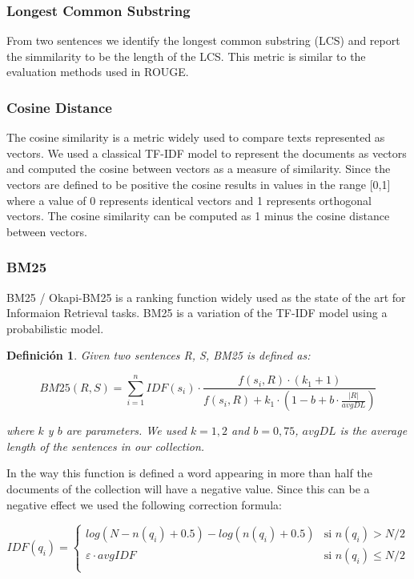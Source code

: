 \documentclass{llncs}
\newtheorem{definicion}{Definición}
\begin{document}
\subsubsection{Longest Common Substring}
From two sentences we identify the longest common substring (LCS) and report the simmilarity to be the length of the LCS. This metric is similar to the evaluation methods used in ROUGE.

\subsubsection{Cosine Distance}
The cosine similarity is a metric widely used to compare texts represented as vectors. We used a classical TF-IDF model to represent the documents as vectors and computed the cosine between vectors as a measure of similarity. Since the vectors are defined to be positive the cosine results in values in the range [0,1] where a value of 0 represents identical vectors and 1 represents orthogonal vectors. The cosine similarity can be computed as 1 minus the cosine distance between vectors. 

\subsubsection{BM25}
BM25 / Okapi-BM25 is a ranking function widely used as the state of the art for Informaion Retrieval tasks. BM25 is a variation of the TF-IDF model using a probabilistic model.

\begin{definicion}
Given two sentences R, S, BM25 is defined as:

\begin{equation}
BM25(R,S) = \sum_{i=1}^{n} IDF(s_i) \cdot \frac{f(s_i, R) \cdot (k_1 + 1)}{f(s_i, R) + k_1 \cdot (1 - b + b \cdot \frac{|R|}{avgDL})}
\end{equation}

where $k$ y $b$ are parameters. We used $k = 1,2$ and $b = 0,75$,  $avgDL$ is the average length of the sentences in our collection.
\end{definicion}

In the way this function is defined a word appearing in more than half the documents of the collection will have a negative value. Since this can be a negative effect we used the following correction formula:
                
\begin{equation}
 IDF(q_i) =
  \begin{cases}
       log(N - n(q_i) + 0.5) - log(n(q_i) + 0.5)    & \text{si }  n(q_i) > N/2\\
       \varepsilon \cdot avgIDF                     & \text{si }  n(q_i) \leq N/2\\
  \end{cases}
\end{equation}                
                
\end{document}
